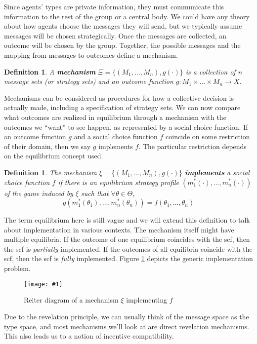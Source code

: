 \documentclass[letter, 10pt]{article}
\newcommand{\scalefig}[3]{
  \begin{figure}[ht!]
    \centering
    \texttt{[image: \#1]}
    \caption{#3}
    \label{#1}
  \end{figure}}
\newtheorem{definition}[theorem]{Definition}
\theoremstyle{definition}
\begin{document}
\begin{spacing}{1.1}
Since agents' types are private information, they must communicate this
information to the rest of the group or a central body. We could have any
theory about how agents choose the messages they will send, but we
typically assume messages will be chosen strategically. Once the messages
are collected, an outcome will be chosen by the group. Together, the
possible messages and the mapping from messages to outcomes define a
mechanism.

\begin{definition}
  A \textbf{mechanism} $\Xi = \{(M_1, \ldots, M_n),
  g(\cdot)\}$ is a collection of $n$ message sets (or
  strategy sets) and an outcome function $g: M_1 \times
  \ldots \times M_n \to X$.
\end{definition}

Mechanisms can be considered as procedures for how a
collective decision is actually made, including a specification of
strategy sets. We can now compare what outcomes are
realized in equilibrium through a mechanism with the
outcomes we ``want'' to see happen, as represented by a
social choice function. If an outcome function $g$ and
a social choice function $f$ coincide on some restriction
of their domain, then we say $g$ implements $f$. The
particular restriction depends on the equilibrium concept used.

\begin{definition}
  The mechanism $\xi = \{(M_1, \ldots, M_n),
  g(\cdot)\}$ \textbf{implements} a social choice function $f$ if
  there is an equilibrium strategy profile
  $(m_1^*(\cdot), \ldots, m_n^*(\cdot))$ of the game
  induced by $\xi$ such that $\forall \theta \in \Theta$,
  \[g(m_1^*(\theta_1), \ldots, m_n^*(\theta_n)) =
  f(\theta_1, \ldots, \theta_n)\]
\end{definition}

The term equilibrium here is still vague and we will extend this definition
to talk about implementation in various contexts. The mechanism itself
might have multiple equilibria. If the outcome of one equilibrium coincides
with the scf, then the scf is \textit{partially} implemented. If the
outcomes of all equilibria coincide with the scf, then the scf is
\textit{fully} implemented.  Figure \ref{reiterdiagram} depicts the generic
implementation problem.

\scalefig{reiterdiagram}{.45}{Reiter diagram of a
  mechanism $\xi$ implementing $f$}

Due to the revelation principle, we can usually think of
the message space as the type space, and most mechanisms
we'll look at are direct revelation mechanisms. This also
leads us to a notion of incentive compatibility.


\end{spacing}
\end{document}
